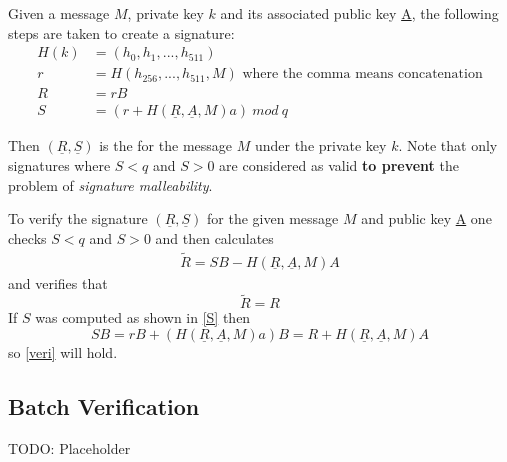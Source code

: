 Given a message $M$, private key $k$ and its associated public key \underline{A}, the following steps are taken to create a signature:
\begin{align}
H(k) &=(h_0, h_1,..., h_{511}) \\
r &= H(h_{256},...,h_{511}, M) \text{ where the comma means concatenation} \\
R &= rB \\
S &= (r + H(\underline{R}, \underline{A}, M)a) \: mod \: q \label{S}
\end{align}

Then $(\underline{R}, \underline{S})$ is the  for the message $M$ under the private key $k$.
Note that only signatures where $S<q$ and $S>0$ are considered as valid \textbf{to prevent} the problem of \emph{signature malleability}.

To verify the signature $(\underline{R}, \underline{S})$ for the given message $M$ and public key \underline{A} one checks $S<q$ and $S>0$ and then calculates
\begin{align*}
\tilde{R} = SB - H(\underline{R}, \underline{A}, M)A
\end{align*}
and verifies that
\begin{equation}\label{veri}
\tilde{R} = R
\end{equation}
If $S$ was computed as shown in \eqref{S} then
$$SB = rB + (H(\underline{R}, \underline{A}, M)a)B = R + H(\underline{R}, \underline{A}, M)A$$
so \eqref{veri} will hold.

\subsection{Batch Verification}

TODO: Placeholder

